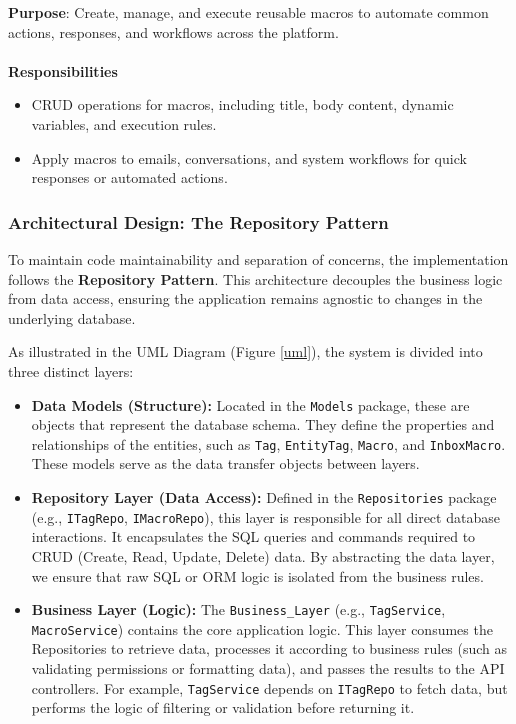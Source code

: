 \textbf{Purpose}: Create, manage, and execute reusable macros to automate common actions, responses, and workflows across the platform.
\\\\
\textbf{Responsibilities}

\begin{itemize}
    \item CRUD operations for macros, including title, body content, dynamic variables, and execution rules.
    \item Apply macros to emails, conversations, and system workflows for quick responses or automated actions.
\end{itemize}

\subsubsection{Architectural Design: The Repository Pattern}
To maintain code maintainability and separation of concerns, the implementation follows the \textbf{Repository Pattern}. This architecture decouples the business logic from data access, ensuring the application remains agnostic to changes in the underlying database.

As illustrated in the UML Diagram (Figure \ref{uml}), the system is divided into three distinct layers:

\begin{itemize}
    \item \textbf{Data Models (Structure):} Located in the \texttt{Models} package, these are objects that represent the database schema. They define the properties and relationships of the entities, such as \texttt{Tag}, \texttt{EntityTag}, \texttt{Macro}, and \texttt{InboxMacro}. These models serve as the data transfer objects between layers.
    
    \item \textbf{Repository Layer (Data Access):} Defined in the \texttt{Repositories} package (e.g., \texttt{ITagRepo}, \texttt{IMacroRepo}), this layer is responsible for all direct database interactions. It encapsulates the SQL queries and commands required to CRUD (Create, Read, Update, Delete) data. By abstracting the data layer, we ensure that raw SQL or ORM logic is isolated from the business rules.
    
    \item \textbf{Business Layer (Logic):} The \texttt{Business\_Layer} (e.g., \texttt{TagService}, \texttt{MacroService}) contains the core application logic. This layer consumes the Repositories to retrieve data, processes it according to business rules (such as validating permissions or formatting data), and passes the results to the API controllers. For example, \texttt{TagService} depends on \texttt{ITagRepo} to fetch data, but performs the logic of filtering or validation before returning it.
\end{itemize}

